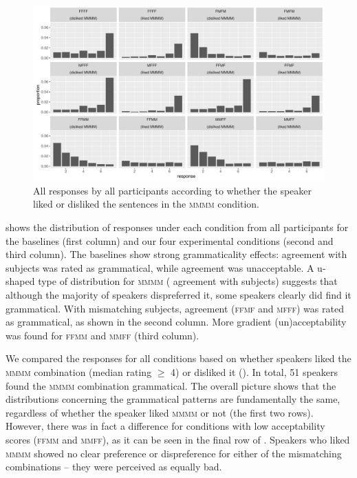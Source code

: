 \documentclass[output=paper,modfonts,newtxmath,hidelinks]{langscibook}
\begin{document}

\begin{figure}[b]
	\centering
	\includegraphics[height=.35\textheight]{figures/14all-resps.pdf}
	\caption{All responses by all participants according to whether the speaker liked or disliked the sentences in the \textsc{mmmm} condition.}\label{14:fig:all-resps-mmmm}
\end{figure}

 shows the distribution of responses under each condition from all participants for the baselines (first column) and our four experimental conditions (second and third column). The baselines show strong grammaticality effects:  agreement with  subjects was rated as grammatical, while  agreement was unacceptable. A u-shaped
type of distribution for \textsc{mmmm} ( agreement with  subjects) suggests that although the majority of
speakers dispreferred it, some speakers clearly did find it grammatical. With mismatching subjects,  agreement (\textsc{ffmf} and \textsc{mfff}) was rated as grammatical, as shown in the second column. More gradient (un)acceptability was found for  \textsc{ffmm} and \textsc{mmff} (third column).

We compared the responses for all conditions based on whether speakers liked the \textsc{mmmm} combination (median rating $\geq$ 4) or disliked it (). In total, 51 speakers found the \textsc{mmmm} combination grammatical. The overall picture shows that the distributions concerning the grammatical patterns are fundamentally the same, regardless of whether the speaker liked \textsc{mmmm} or not (the first two rows). However, there was in fact a difference for conditions with low acceptability scores (\textsc{ffmm} and \textsc{mmff}), as it can be seen in the final row of . Speakers who liked \textsc{mmmm} showed no clear preference or dispreference for either of the mismatching combinations -- they were perceived as equally bad.
\end{document}
